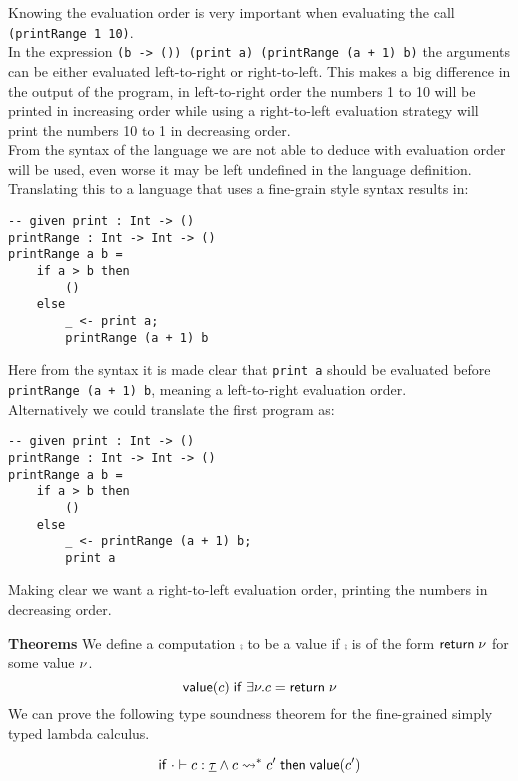{Knowing the evaluation order is very important when evaluating the call \texttt{(printRange 1 10)}.
\\
In the expression \texttt{(\a b -> ()) (print a) (printRange (a + 1) b)} the arguments can be either evaluated left-to-right or right-to-left.
This makes a big difference in the output of the program, in left-to-right order the numbers 1 to 10 will be printed in increasing order while using a right-to-left evaluation strategy will print the numbers 10 to 1 in decreasing order.
\\
From the syntax of the language we are not able to deduce with evaluation order will be used, even worse it may be left undefined in the language definition.
\\
Translating this to a language that uses a fine-grain style syntax results in:
\begin{verbatim}
-- given print : Int -> ()
printRange : Int -> Int -> ()
printRange a b =
	if a > b then
		()
	else
		_ <- print a;
		printRange (a + 1) b
\end{verbatim}
Here from the syntax it is made clear that \texttt{print a} should be evaluated before \texttt{printRange (a + 1) b}, meaning a left-to-right evaluation order.
\\
Alternatively we could translate the first program as:
\begin{verbatim}
-- given print : Int -> ()
printRange : Int -> Int -> ()
printRange a b =
	if a > b then
		()
	else
		_ <- printRange (a + 1) b;
		print a
\end{verbatim}
Making clear we want a right-to-left evaluation order, printing the numbers in decreasing order.

\textbf{Theorems}
We define a computation $\comp$ to be a value if $\comp$ is of the form $\mathsf{return} \; \nu$ for some value $\nu$.
	\[ \mathsf{value}(c) \;\mathsf{if}\; \exists \nu. c = \mathsf{return} \; \nu \]
We can prove the following type soundness theorem for the fine-grained simply typed lambda calculus.

\begin{theorem}
\[
	\mathsf{if}\;
		\cdot \vdash c : \underline{\tau}
		\land
		c \rightsquigarrow^* c'
	\;\mathsf{then}\;
		\mathsf{value}(c')
\]
\end{theorem}

}
